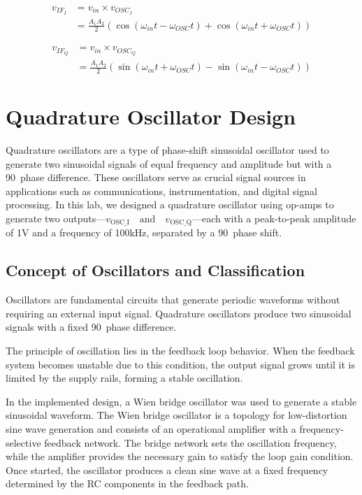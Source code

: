 \documentclass[conference]{IEEEtran}
\begin{document}
\begin{equation}
\begin{split}
v_{IF_I} &= v_{in} \times v_{OSC_I}\\
&= \frac{A_1 A_2}{2} (\cos (\omega_{in}t - \omega_{OSC}t) + \cos (\omega_{in}t + \omega_{OSC}t))
\end{split}
\tag{iv}
\end{equation}

\vspace{-0.5cm}

\begin{equation}
\begin{split}
v_{IF_Q} &= v_{in} \times v_{OSC_Q}\\
&= \frac{A_1 A_2}{2} (\sin(\omega_{in}t + \omega_{OSC}t) - \sin (\omega_{in}t - \omega_{OSC}t))
\end{split}
\tag{v}
\end{equation}

\section{Quadrature Oscillator Design}
Quadrature oscillators are a type of phase-shift sinusoidal oscillator used to generate two sinusoidal signals of equal frequency and amplitude but with a 90\textdegree\ phase difference. These oscillators serve as crucial signal sources in applications such as communications, instrumentation, and digital signal processing. In this lab, we designed a quadrature oscillator using op-amps to generate two outputs—$v_{\text{OSC\_I}} \quad \text{and} \quad v_{\text{OSC\_Q}}$—each with a peak-to-peak amplitude of 1V and a frequency of 100kHz, separated by a 90\textdegree\ phase shift.

\subsection{Concept of Oscillators and Classification}
Oscillators are fundamental circuits that generate periodic waveforms without requiring an external input signal. Quadrature oscillators produce two sinusoidal signals with a fixed 90\textdegree\ phase difference.

The principle of oscillation lies in the feedback loop behavior. When the feedback system becomes unstable due to this condition, the output signal grows until it is limited by the supply rails, forming a stable oscillation.

In the implemented design, a Wien bridge oscillator was used to generate a stable sinusoidal waveform. The Wien bridge oscillator is a topology for low-distortion sine wave generation and consists of an operational amplifier with a frequency-selective feedback network. The bridge network sets the oscillation frequency, while the amplifier provides the necessary gain to satisfy the loop gain condition. Once started, the oscillator produces a clean sine wave at a fixed frequency determined by the RC components in the feedback path.
\end{document}
